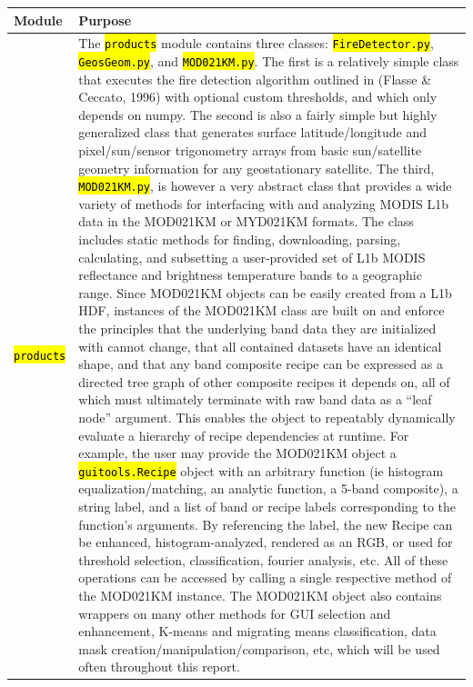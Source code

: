 \documentclass[12pt]{article}
\newcommand{\hltexttt}[1]{\texttt{\hl{#1}}}
\begin{document}
\begin{table}[h!]
    \begin{tabular}{ l p{14cm} }

        \textbf{Module} & \textbf{Purpose} \\\hline

        \hltexttt{products} &
        The \hltexttt{products} module contains three classes: \hltexttt{FireDetector.py}, \hltexttt{GeosGeom.py}, and \hltexttt{MOD021KM.py}. The first is a relatively simple class that executes the fire detection algorithm outlined in (Flasse \& Ceccato, 1996) \cite{flasse1996} with optional custom thresholds, and which only depends on numpy. The second is also a fairly simple but highly generalized class that generates surface latitude/longitude and pixel/sun/sensor trigonometry arrays from basic sun/satellite geometry information for any geostationary satellite. The third, \hltexttt{MOD021KM.py}, is however a very abstract class that provides a wide variety of methods for interfacing with and analyzing MODIS L1b data in the MOD021KM or MYD021KM formats. The class includes static methods for finding, downloading, parsing, calculating, and subsetting a user-provided set of L1b MODIS reflectance and brightness temperature bands to a geographic range. Since MOD021KM objects can be easily created from a L1b HDF, instances of the MOD021KM class are built on and enforce the principles that the underlying band data they are initialized with cannot change, that all contained datasets have an identical shape, and that any band composite recipe can be expressed as a directed tree graph of other composite recipes it depends on, all of which must ultimately terminate with raw band data as a ``leaf node'' argument. This enables the object to repeatably dynamically evaluate a hierarchy of recipe dependencies at runtime. For example, the user may provide the MOD021KM object a \hltexttt{guitools.Recipe} object with an arbitrary function (ie histogram equalization/matching, an analytic function, a 5-band composite), a string label, and a list of band or recipe labels corresponding to the function's arguments. By referencing the label, the new Recipe can be enhanced, histogram-analyzed, rendered as an RGB, or used for threshold selection, classification, fourier analysis, etc. All of these operations can be accessed by calling a single respective method of the MOD021KM instance. The MOD021KM object also contains wrappers on many other methods for GUI selection and enhancement, K-means and migrating means classification, data mask creation/manipulation/comparison, etc, which will be used often throughout this report.
        \\\hline


\end{tabular}
\end{table}
\end{document}
